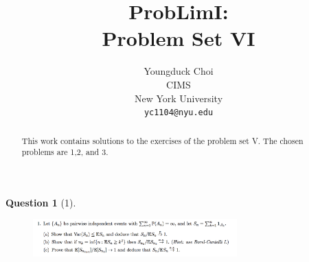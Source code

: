 \documentclass{article} %
\title{ProbLimI: \\
Problem Set VI}
\author{
Youngduck Choi \\
CIMS \\
New York University\\
\texttt{yc1104@nyu.edu} \\
}
\theoremstyle{quest}
\newtheorem*{question}{Question}
\begin{document}
\maketitle

\begin{abstract}
This work contains solutions to the exercises of the problem set V. The
chosen problems are 1,2, and 3.
\end{abstract}

\bigskip

\begin{question}[1]
\hfill
\begin{figure}[h!]
  \centering
    \includegraphics[width=0.7\textwidth]{prob-e6-p1.png}
\end{figure}
\end{question}
\end{document}
